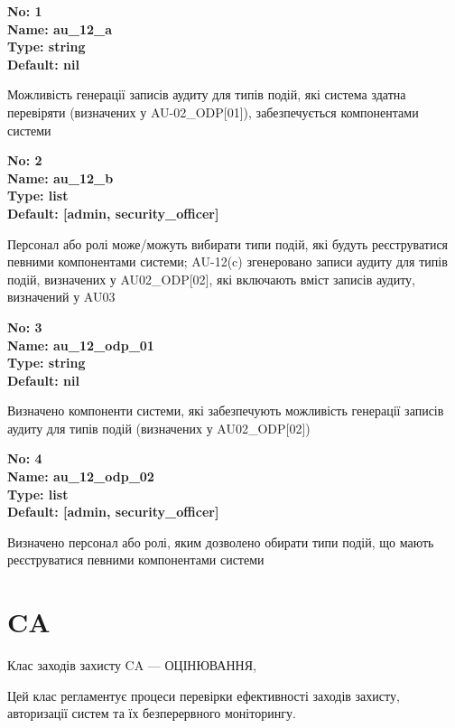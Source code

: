 \documentclass{article}
\begin{document}
\vspace{10pt}
{\footnotesize\bfseries
No: 1\\
Name: au\_\allowbreak{}12\_\allowbreak{}a\\
Type: string\\
Default: nil
}

{\footnotesize Можливість генерації записів аудиту для типів подій, які система здатна перевіряти (визначених у AU-02\_\allowbreak{}ODP[01]), забезпечується компонентами системи}


{\footnotesize\bfseries
No: 2\\
Name: au\_\allowbreak{}12\_\allowbreak{}b\\
Type: list\\
Default: [\textquotedbl{}admin\textquotedbl{}, \textquotedbl{}security\_\allowbreak{}officer\textquotedbl{}]
}

{\footnotesize Персонал або ролі може/можуть вибирати типи подій, які будуть реєструватися певними компонентами системи; AU-12(c) згенеровано записи аудиту для типів подій, визначених у AU02\_\allowbreak{}ODP[02], які включають вміст записів аудиту, визначений у AU03}


{\footnotesize\bfseries
No: 3\\
Name: au\_\allowbreak{}12\_\allowbreak{}odp\_\allowbreak{}01\\
Type: string\\
Default: nil
}

{\footnotesize Визначено компоненти системи, які забезпечують можливість генерації записів аудиту для типів подій (визначених у AU02\_\allowbreak{}ODP[02])}


{\footnotesize\bfseries
No: 4\\
Name: au\_\allowbreak{}12\_\allowbreak{}odp\_\allowbreak{}02\\
Type: list\\
Default: [\textquotedbl{}admin\textquotedbl{}, \textquotedbl{}security\_\allowbreak{}officer\textquotedbl{}]
}

{\footnotesize Визначено персонал або ролі, яким дозволено обирати типи подій, що мають реєструватися певними компонентами системи}




\section{CA}
Клас заходів захисту CA --- ОЦІНЮВАННЯ,

Цей клас регламентує процеси перевірки ефективності заходів захисту, авторизації систем та їх безперервного моніторингу.
\end{document}
